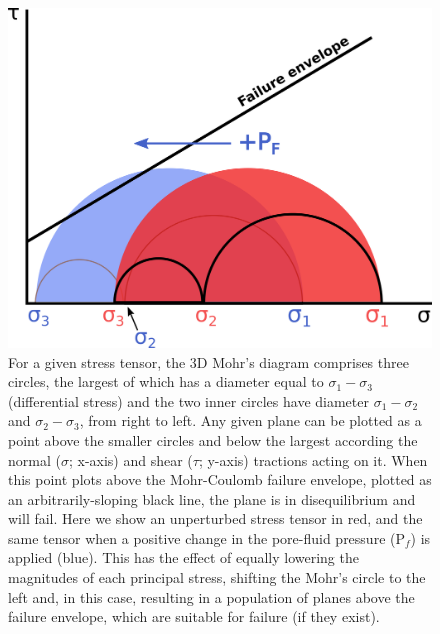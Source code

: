 \begin{figure}[h!]
\begin{center}
\includegraphics[width=0.7\columnwidth]{Chapter_1_Intro/figures/Pf_increase_mohr/Pf_increase_mohr}
\caption[Mohr circles showing the effect of pore-fluid pressure]{{
For a given stress tensor, the 3D Mohr's diagram comprises three circles, the largest of which has a diameter equal to $\sigma_{1} - \sigma_{3}$ (differential stress) and the two inner circles have diameter $\sigma_{1} - \sigma_{2}$ and $\sigma_{2} - \sigma_{3}$, from right to left. Any given plane can be plotted as a point above the smaller circles and below the largest according the normal ($\sigma$; x-axis) and shear ($\tau$; y-axis) tractions acting on it. When this point plots above the Mohr-Coulomb failure envelope, plotted as an arbitrarily-sloping black line, the plane is in disequilibrium and will fail. Here we show an unperturbed stress tensor in red, and the same tensor when a positive change in the pore-fluid pressure (P$_{f}$) is applied (blue). This has the effect of equally lowering the magnitudes of each principal stress, shifting the Mohr's circle to the left and, in this case, resulting in a population of planes above the failure envelope, which are suitable for failure (if they exist).
{\label{469299}}%
}}
\end{center}
\end{figure}



